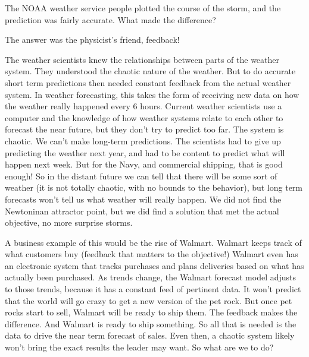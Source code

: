 \documentclass{article}
\begin{document}

The NOAA weather service people plotted the course of the storm, and the
prediction was fairly accurate. What made the difference?

The answer was the physicist's friend, feedback!

The weather scientists knew the relationships between parts of the weather
system. They understood the chaotic nature of the weather. But to do
accurate short term predictions then needed constant feedback from the
actual weather system. In weather forecasting, this takes the form of
receiving new data on how the weather really happened every 6 hours. Current
weather scientists use a computer and the knowledge of how weather systems
relate to each other to forecast the near future, but they don't try to
predict too far. The system is chaotic. We can't make long-term predictions.
The scientists had to give up predicting the weather next year, and had to
be content to predict what will happen next week. But for the Navy, and
commercial shipping, that is good enough! So in the distant future we can
tell that there will be some sort of weather (it is not totally chaotic,
with no bounds to the behavior), but long term forecasts won't tell us what
weather will really happen. We did not find the Newtoninan attractor point,
but we did find a solution that met the actual objective, no more surprise
storms.


A business example of this would be the rise of Walmart. Walmart keeps track
of what customers buy (feedback that matters to the objective!) Walmart even
has an electronic system that tracks purchases and plans deliveries based on
what has actually been purchased. As trends change, the Walmart forecast
model adjusts to those trends, because it has a constant feed of pertinent
data. It won't predict that the world will go crazy to get a new version of
the pet rock. But once pet rocks start to sell, Walmart will be ready to
ship them. The feedback makes the difference. And Walmart is ready to ship
something. So all that is needed is the data to drive the near term forecast
of sales. Even then, a chaotic system likely won't bring the exact results
the leader may want. So what are we to do?
\end{document}
